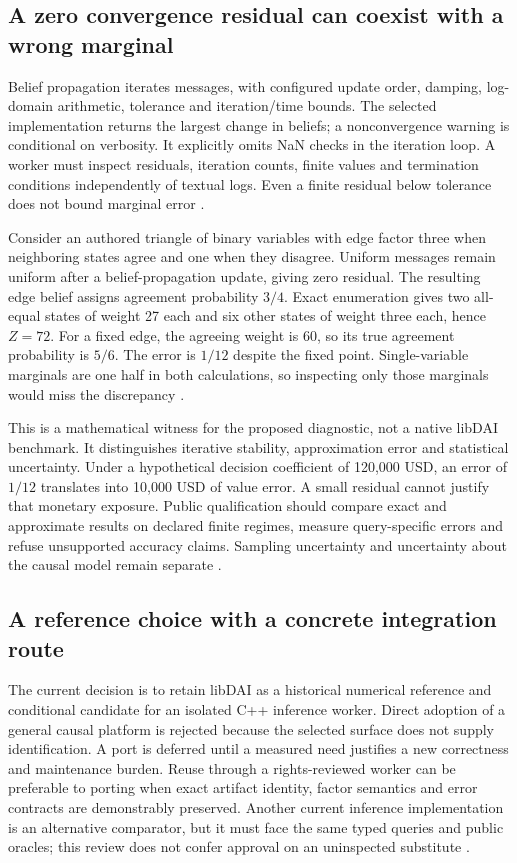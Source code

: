 \subsection{A zero convergence residual can coexist with a wrong marginal}
Belief propagation iterates messages, with configured update order, damping,
log-domain arithmetic, tolerance and iteration/time bounds. The selected
implementation returns the largest change in beliefs; a nonconvergence
warning is conditional on verbosity. It explicitly omits NaN checks in the
iteration loop. A worker must inspect residuals, iteration counts, finite
values and termination conditions independently of textual logs. Even a
finite residual below tolerance does not bound marginal error
\citep{exec24_libdai_source}.

Consider an authored triangle of binary variables with edge factor three
when neighboring states agree and one when they disagree. Uniform messages
remain uniform after a belief-propagation update, giving zero residual.
The resulting edge belief assigns agreement probability $3/4$. Exact
enumeration gives two all-equal states of weight 27 each and six other
states of weight three each, hence $Z=72$. For a fixed edge, the agreeing
weight is 60, so its true agreement probability is $5/6$. The error is
$1/12$ despite the fixed point. Single-variable marginals are one half in
both calculations, so inspecting only those marginals would miss the
discrepancy \citep{exec24_libdai_choice}.

This is a mathematical witness for the proposed diagnostic, not a native
libDAI benchmark. It distinguishes iterative stability, approximation error
and statistical uncertainty. Under a hypothetical decision coefficient of
120,000 USD, an error of $1/12$ translates into 10,000 USD of value error.
A small residual cannot justify that monetary exposure. Public qualification
should compare exact and approximate results on declared finite regimes,
measure query-specific errors and refuse unsupported accuracy claims.
Sampling uncertainty and uncertainty about the causal model remain separate
\citep{exec24_libdai_choice}.

\subsection{A reference choice with a concrete integration route}
The current decision is to retain libDAI as a historical numerical reference
and conditional candidate for an isolated C++ inference worker. Direct
adoption of a general causal platform is rejected because the selected
surface does not supply identification. A port is deferred until a measured
need justifies a new correctness and maintenance burden. Reuse through a
rights-reviewed worker can be preferable to porting when exact artifact
identity, factor semantics and error contracts are demonstrably preserved.
Another current inference implementation is an alternative comparator,
but it must face the same typed queries and public oracles; this review does
not confer approval on an uninspected substitute \citep{exec24_libdai_choice}.


